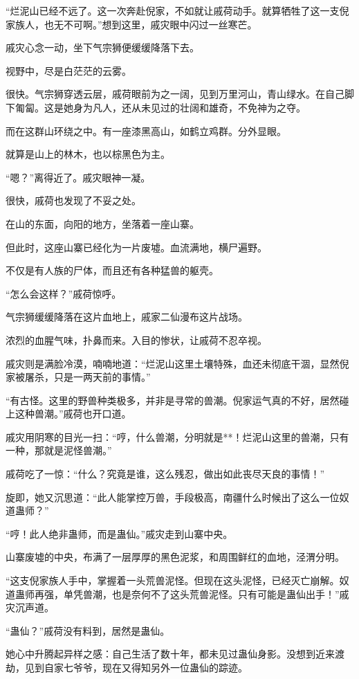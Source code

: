 \begin{this_body}
“烂泥山已经不远了。这一次奔赴倪家，不如就让戚荷动手。就算牺牲了这一支倪家族人，也无不可啊。”想到这里，戚灾眼中闪过一丝寒芒。

戚灾心念一动，坐下气宗狮便缓缓降落下去。

视野中，尽是白茫茫的云雾。

很快。气宗狮穿透云层，戚荷眼前为之一阔，见到万里河山，青山绿水。在自己脚下匍匐。这是她身为凡人，还从未见过的壮阔和雄奇，不免神为之夺。

而在这群山环绕之中。有一座漆黑高山，如鹤立鸡群。分外显眼。

就算是山上的林木，也以棕黑色为主。

“嗯？”离得近了。戚灾眼神一凝。

很快，戚荷也发现了不妥之处。

在山的东面，向阳的地方，坐落着一座山寨。

但此时，这座山寨已经化为一片废墟。血流满地，横尸遍野。

不仅是有人族的尸体，而且还有各种猛兽的躯壳。

“怎么会这样？”戚荷惊呼。

气宗狮缓缓降落在这片血地上，戚家二仙漫布这片战场。

浓烈的血腥气味，扑鼻而来。入目的惨状，让戚荷不忍卒视。

戚灾则是满脸冷漠，喃喃地道：“烂泥山这里土壤特殊，血还未彻底干涸，显然倪家被屠杀，只是一两天前的事情。”

“有古怪。这里的野兽种类极多，并非是寻常的兽潮。倪家运气真的不好，居然碰上这种兽潮。”戚荷也开口道。

戚灾用阴寒的目光一扫：“哼，什么兽潮，分明就是**！烂泥山这里的兽潮，只有一种，那就是泥怪兽潮。”

戚荷吃了一惊：“什么？究竟是谁，这么残忍，做出如此丧尽天良的事情！”

旋即，她又沉思道：“此人能掌控万兽，手段极高，南疆什么时候出了这么一位奴道蛊师？”

“哼！此人绝非蛊师，而是蛊仙。”戚灾走到山寨中央。

山寨废墟的中央，布满了一层厚厚的黑色泥浆，和周围鲜红的血地，泾渭分明。

“这支倪家族人手中，掌握着一头荒兽泥怪。但现在这头泥怪，已经灭亡崩解。奴道蛊师再强，单凭兽潮，也是奈何不了这头荒兽泥怪。只有可能是蛊仙出手！”戚灾沉声道。

“蛊仙？”戚荷没有料到，居然是蛊仙。

她心中升腾起异样之感：自己生活了数十年，都未见过蛊仙身影。没想到近来渡劫，见到自家七爷爷，现在又得知另外一位蛊仙的踪迹。


\end{this_body}
